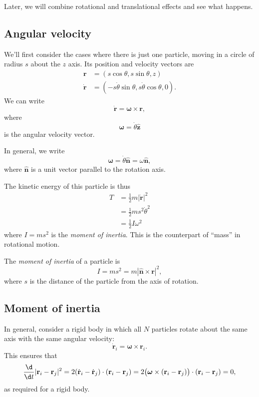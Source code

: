 \documentclass[a4paper]{article}
\begin{document}
Later, we will combine rotational and translational effects and see what happens.

\subsection{Angular velocity}
We'll first consider the cases where there is just one particle, moving in a circle of radius $s$ about the $z$ axis. Its position and velocity vectors are
\begin{align*}
  \mathbf{r} &= (s\cos \theta, s\sin \theta, z)\\
  \dot{\mathbf{r}} &= (-s \dot{\theta}\sin \theta, s\dot{\theta}\cos \theta, 0).
\end{align*}
We can write
\[
  \dot{\mathbf{r}} = \boldsymbol\omega\times \mathbf{r},
\]
where
\[
  \boldsymbol\omega = \dot{\theta}\hat{\mathbf{z}}
\]
is the angular velocity vector.

In general, we write
\[
  \boldsymbol\omega = \dot{\theta} \hat{\mathbf{n}} = \omega\hat{\mathbf{n}},
\]
where $\hat{\mathbf{n}}$ is a unit vector parallel to the rotation axis.

The kinetic energy of this particle is thus
\begin{align*}
  T &= \frac{1}{2}m|\dot{\mathbf{r}}|^2\\
  &= \frac{1}{2}m s^2 \dot{\theta}^2\\
  &= \frac{1}{2}I \omega^2
\end{align*}
where $I = ms^2$ is the \emph{moment of inertia}. This is the counterpart of ``mass'' in rotational motion.
\begin{defi}
  The \emph{moment of inertia} of a particle is
  \[
    I = ms^2 = m|\hat{\mathbf{n}}\times \mathbf{r}|^2,
  \]
  where $s$ is the distance of the particle from the axis of rotation.
\end{defi}
\subsection{Moment of inertia}
In general, consider a rigid body in which all $N$ particles rotate about the same axis with the same angular velocity:
\[
  \dot{\mathbf{r}}_i = \boldsymbol\omega\times \mathbf{r}_i.
\]
This ensures that
\[
  \frac{\d }{\d t}|\mathbf{r}_i - \mathbf{r}_j|^2 = 2(\dot{\mathbf{r}}_i - \dot{\mathbf{r}}_j)\cdot (\mathbf{r}_i - \mathbf{r}_j) = 2\big(\boldsymbol\omega\times (\mathbf{r}_i - \mathbf{r}_j)\big) \cdot (\mathbf{r}_i - \mathbf{r}_j) = 0,
\]
as required for a rigid body.
\end{document}
